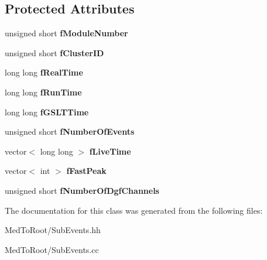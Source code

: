 \subsection*{Protected Attributes}
\begin{DoxyCompactItemize}
\item 
\hypertarget{class_dgf_scaler_sub_event_a86dbc7481d266b668799d198807df991}{unsigned short {\bfseries f\-Module\-Number}}\label{class_dgf_scaler_sub_event_a86dbc7481d266b668799d198807df991}

\item 
\hypertarget{class_dgf_scaler_sub_event_a308d5787aeb511ce698e021d69fa8d46}{unsigned short {\bfseries f\-Cluster\-I\-D}}\label{class_dgf_scaler_sub_event_a308d5787aeb511ce698e021d69fa8d46}

\item 
\hypertarget{class_dgf_scaler_sub_event_aa459f724ff8a6621d2ce35bb8d9ac971}{long long {\bfseries f\-Real\-Time}}\label{class_dgf_scaler_sub_event_aa459f724ff8a6621d2ce35bb8d9ac971}

\item 
\hypertarget{class_dgf_scaler_sub_event_a2d9ebb7063c5b6ad3beabedc58a2d4ef}{long long {\bfseries f\-Run\-Time}}\label{class_dgf_scaler_sub_event_a2d9ebb7063c5b6ad3beabedc58a2d4ef}

\item 
\hypertarget{class_dgf_scaler_sub_event_aa3de3cbc37314d07172d9899e9b2951b}{long long {\bfseries f\-G\-S\-L\-T\-Time}}\label{class_dgf_scaler_sub_event_aa3de3cbc37314d07172d9899e9b2951b}

\item 
\hypertarget{class_dgf_scaler_sub_event_afbbc4fdf75ad471453e0bd8930286aae}{unsigned short {\bfseries f\-Number\-Of\-Events}}\label{class_dgf_scaler_sub_event_afbbc4fdf75ad471453e0bd8930286aae}

\item 
\hypertarget{class_dgf_scaler_sub_event_a7433bbc94024bb171af20d2b98658686}{vector$<$ long long $>$ {\bfseries f\-Live\-Time}}\label{class_dgf_scaler_sub_event_a7433bbc94024bb171af20d2b98658686}

\item 
\hypertarget{class_dgf_scaler_sub_event_a5847eac857f67c4add3c15a7b2bb890d}{vector$<$ int $>$ {\bfseries f\-Fast\-Peak}}\label{class_dgf_scaler_sub_event_a5847eac857f67c4add3c15a7b2bb890d}

\item 
\hypertarget{class_dgf_scaler_sub_event_a2deb4d871695699aac992b4179881137}{unsigned short {\bfseries f\-Number\-Of\-Dgf\-Channels}}\label{class_dgf_scaler_sub_event_a2deb4d871695699aac992b4179881137}

\end{DoxyCompactItemize}


The documentation for this class was generated from the following files\-:\begin{DoxyCompactItemize}
\item 
Med\-To\-Root/Sub\-Events.\-hh\item 
Med\-To\-Root/Sub\-Events.\-cc\end{DoxyCompactItemize}
